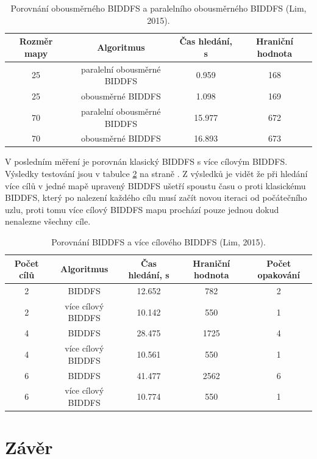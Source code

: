 \documentclass[12pt]{report}
\begin{document}
\begin{table}[h]
	\centering
	\begin{tabular}{c|c|c|c}
		\hline
		Rozměr mapy & Algoritmus & Čas hledání, s & Hraniční hodnota \\
		\hline
		25 & paralelní obousměrné BIDDFS & 0.959 & 168 \\
		25 & obousměrné BIDDFS & 1.098 & 169 \\
		\hline
		70 & paralelní obousměrné BIDDFS & 15.977 & 672 \\
		70 & obousměrné BIDDFS & 16.893 & 673 \\
		\hline
	\end{tabular}
	\caption{Porovnání obousměrného BIDDFS a paralelního obousměrného BIDDFS (Lim, 2015).}
	\label{tab:bbiddfsvspbbiddfs}
\end{table}

	\newpage

 	V posledním měření je porovnán klasický BIDDFS s více cílovým BIDDFS. Výsledky testování jsou v tabulce \ref{tab:mg-biddfs} na straně \pageref{fig:mg-biddfs}. Z výsledků je vidět že při hledání více cílů v jedné mapě upravený BIDDFS ušetří spoustu času o proti klasickému BIDDFS, který po nalezení každého cílu musí začít novou iteraci od počátečního uzlu, proti tomu více cílový BIDDFS mapu prochází pouze jednou dokud nenalezne všechny cíle.	
 	
 	\begin{table}[h]
 		\centering
 		\begin{tabular}{c|c|c|c|c}
 			\hline
 			Počet cílů & Algoritmus & Čas hledání, s & Hraniční hodnota & Počet opakování\\
 			\hline
 			2 & BIDDFS & 12.652 & 782 & 2\\
 			2 & více cílový BIDDFS & 10.142 & 550 & 1\\
 			\hline
 			4 & BIDDFS & 28.475 & 1725 & 4\\
 			4 & více cílový BIDDFS & 10.561 & 550 & 1\\
 			\hline
 			6 & BIDDFS & 41.477 & 2562 & 6\\
 			6 & více cílový BIDDFS & 10.774 & 550 & 1\\
 			\hline
 		\end{tabular}
 		\caption{Porovnání BIDDFS a více cílového BIDDFS (Lim, 2015).}
 		\label{tab:mg-biddfs}
 	\end{table}
	
	\section*{Závěr}
	
\end{document}
